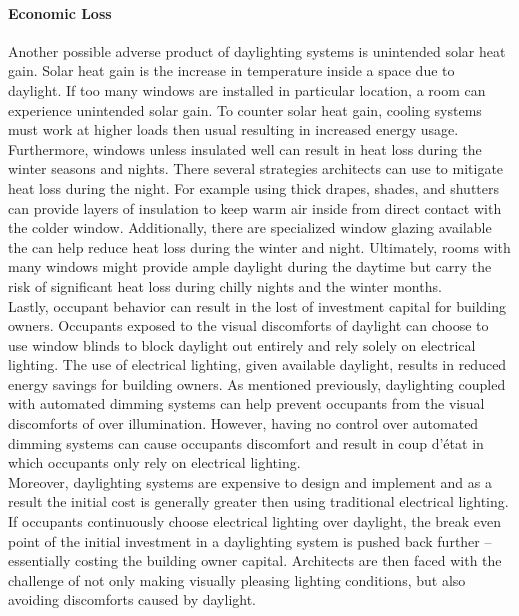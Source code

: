     \paragraph{Economic Loss}
    
    Another possible adverse product of daylighting systems is unintended solar heat gain. Solar heat gain is the increase in temperature inside a space due to daylight. 
    If too many windows are installed in particular location, a room can experience unintended solar gain.
    To counter solar heat gain, cooling systems must work at higher loads then usual resulting in increased energy usage.
    Furthermore, windows unless insulated well can result in heat loss during the winter seasons and nights.
    There several strategies architects can use to mitigate heat loss during the night.
    For example using thick drapes, shades, and shutters can provide layers of insulation to keep warm air inside from direct contact with the colder window.
    Additionally, there are specialized window glazing available the can help reduce heat loss during the winter and night.
    Ultimately, rooms with many windows might provide ample daylight during the daytime but carry the risk of significant heat loss during chilly nights and the winter months.
    \\

    Lastly, occupant behavior can result in the lost of investment capital for building owners.
    Occupants exposed to the visual discomforts of daylight can choose to use window blinds to block daylight out entirely and rely solely on electrical lighting.
    The use of electrical lighting, given available daylight, results in reduced energy savings for building owners.
    As mentioned previously, daylighting coupled with automated dimming systems can help prevent occupants from the visual discomforts of over illumination.
    However, having no control over automated dimming systems can cause occupants discomfort and result in coup d'\'{e}tat in which occupants only rely on electrical lighting.%
    \\

    Moreover, daylighting systems are expensive to design and implement and as a result the initial cost is generally greater then using traditional electrical lighting.
    If occupants continuously choose electrical lighting over daylight, the break even point of the initial investment in a daylighting system is pushed back further -- essentially costing the building owner capital.
    Architects are then faced with the challenge of not only making visually pleasing lighting conditions, but also avoiding discomforts caused by daylight.


